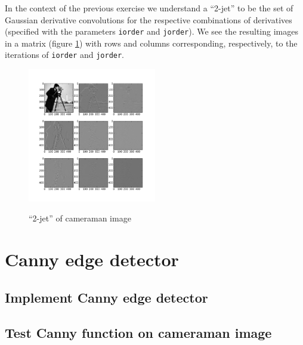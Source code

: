 \documentclass[abstract=true]{scrartcl}
\begin{document}
        In the context of the previous exercise we understand a ``2-jet'' to be
        the set of Gaussian derivative convolutions for the respective
        combinations of derivatives (specified with the parameters
        \texttt{iorder} and \texttt{jorder}). We see the resulting images in a
        matrix (figure \ref{2jet}) with rows and columns corresponding,
        respectively, to the iterations of \texttt{iorder} and \texttt{jorder}. 

        \begin{figure}
          \centering
          {\includegraphics[width=0.5\textwidth]{../images/5_2jet}}                
          \caption{``2-jet'' of cameraman image}
          \label{2jet}
        \end{figure}


\section{Canny edge detector}

    \subsection{Implement Canny edge detector}

    \subsection{Test Canny function on cameraman image}


\end{document}

